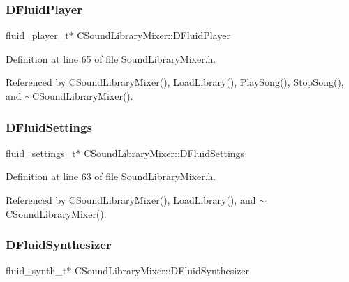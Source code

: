 \subsubsection{\texorpdfstring{D\+Fluid\+Player}{DFluidPlayer}}
{\footnotesize\ttfamily fluid\+\_\+player\+\_\+t$\ast$ C\+Sound\+Library\+Mixer\+::\+D\+Fluid\+Player\hspace{0.3cm}{\ttfamily [protected]}}



Definition at line 65 of file Sound\+Library\+Mixer.\+h.



Referenced by C\+Sound\+Library\+Mixer(), Load\+Library(), Play\+Song(), Stop\+Song(), and $\sim$\+C\+Sound\+Library\+Mixer().

\hypertarget{classCSoundLibraryMixer_a2c6fb394c8bed99adb019576dc7f6eee}{}\label{classCSoundLibraryMixer_a2c6fb394c8bed99adb019576dc7f6eee} 
\subsubsection{\texorpdfstring{D\+Fluid\+Settings}{DFluidSettings}}
{\footnotesize\ttfamily fluid\+\_\+settings\+\_\+t$\ast$ C\+Sound\+Library\+Mixer\+::\+D\+Fluid\+Settings\hspace{0.3cm}{\ttfamily [protected]}}



Definition at line 63 of file Sound\+Library\+Mixer.\+h.



Referenced by C\+Sound\+Library\+Mixer(), Load\+Library(), and $\sim$\+C\+Sound\+Library\+Mixer().

\hypertarget{classCSoundLibraryMixer_a6c1663c381dbf2aa18c82a23141f409c}{}\label{classCSoundLibraryMixer_a6c1663c381dbf2aa18c82a23141f409c} 
\subsubsection{\texorpdfstring{D\+Fluid\+Synthesizer}{DFluidSynthesizer}}
{\footnotesize\ttfamily fluid\+\_\+synth\+\_\+t$\ast$ C\+Sound\+Library\+Mixer\+::\+D\+Fluid\+Synthesizer\hspace{0.3cm}{\ttfamily [protected]}}



